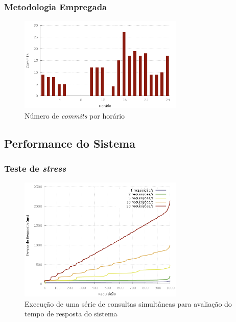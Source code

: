 \frame
{
\frametitle{Metodologia Empregada}
\begin{figure}
\includegraphics[width=0.7\textwidth]{./imgs/hour_of_day.png}
\caption{Número de \emph{commits} por horário}
\end{figure}
}

\subsection{Performance do Sistema}
\frame
{
\frametitle{Teste de \emph{stress}}
\begin{figure}
\includegraphics[width=0.7\textwidth]{./imgs/out.png}
\caption{Execução de uma série de consultas simultâneas para avaliação do tempo de resposta do sistema}
\end{figure}
}
